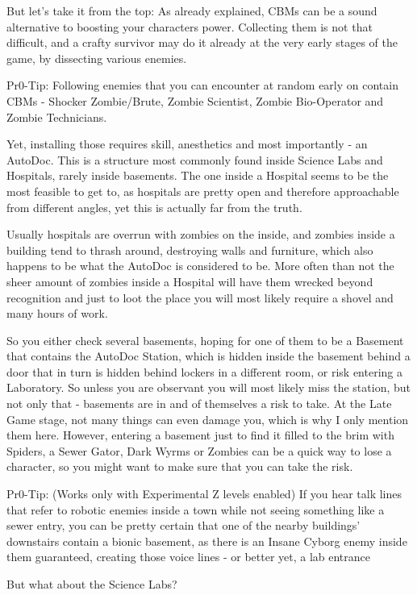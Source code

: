 But let's take it from the top:
As already explained, CBMs can be a sound alternative to boosting your characters power. Collecting them is not that difficult, and a crafty survivor may do it already at the very early stages of the game, by dissecting various enemies.

Pr0-Tip: Following enemies that you can encounter at random early on contain CBMs - Shocker Zombie/Brute, Zombie Scientist, Zombie Bio-Operator and Zombie Technicians.

Yet, installing those requires skill, anesthetics and most importantly - an AutoDoc. This is a structure most commonly found inside Science Labs and Hospitals, rarely inside basements. The one inside a Hospital seems to be the most feasible to get to, as hospitals are pretty open and therefore approachable from different angles, yet this is actually far from the truth.

Usually hospitals are overrun with zombies on the inside, and zombies inside a building tend to thrash around, destroying walls and furniture, which also happens to be what the AutoDoc is considered to be. More often than not the sheer amount of zombies inside a Hospital will have them wrecked beyond recognition and just to loot the place you will most likely require a shovel and many hours of work.

So you either check several basements, hoping for one of them to be a Basement that contains the AutoDoc Station, which is hidden inside the basement behind a door that in turn is hidden behind lockers in a different room, or risk entering a Laboratory. So unless you are observant you will most likely miss the station, but not only that - basements are in and of themselves a risk to take. At the Late Game stage, not many things can even damage you, which is why I only mention them here. However, entering a basement just to find it filled to the brim with Spiders, a Sewer Gator, Dark Wyrms or Zombies can be a quick way to lose a character, so you might want to make sure that you can take the risk.

Pr0-Tip: (Works only with Experimental Z levels enabled) If you hear talk lines that refer to robotic enemies inside a town while not seeing something like a sewer entry, you can be pretty certain that one of the nearby buildings' downstairs contain a bionic basement, as there is an Insane Cyborg enemy inside them guaranteed, creating those voice lines - or better yet, a lab entrance

But what about the Science Labs?

